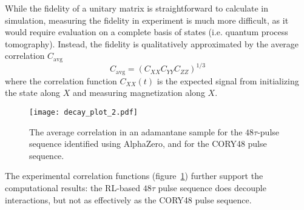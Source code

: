 While the fidelity of a unitary matrix is straightforward to calculate in simulation, measuring the fidelity in experiment is much more difficult, as it would require evaluation on a complete basis of states (i.e. quantum process tomography).
Instead, the fidelity is qualitatively approximated by the average correlation $C_\text{avg}$ \cite{peng2021deep}
\[
C_\text{avg} = (C_{XX} C_{YY} C_{ZZ})^{1/3}
\]
where the correlation function $C_{XX}(t)$ is the expected signal from initializing the state along $X$ and measuring magnetization along $X$.

\begin{figure}[H]
    \centering
    \texttt{[image: decay\_plot\_2.pdf]}
    \caption{The average correlation in an adamantane sample for the $48\tau$-pulse sequence identified using AlphaZero, and for the CORY48 pulse sequence.}
    \label{fig:decay_plot}
\end{figure}

The experimental correlation functions (figure~\ref{fig:decay_plot}) further support the computational results: the RL-based $48\tau$ pulse sequence does decouple interactions, but not as effectively as the CORY48 pulse sequence.
